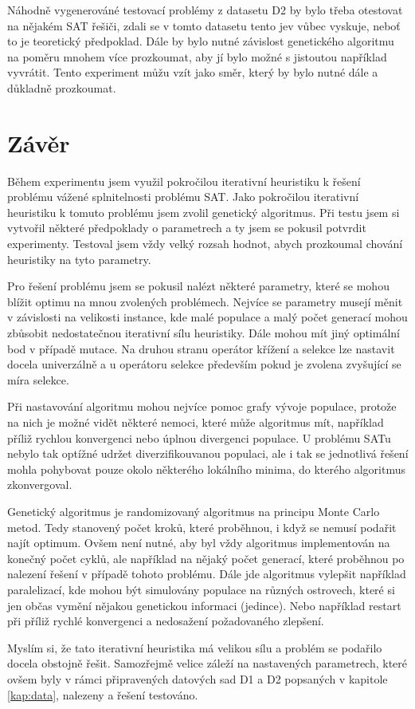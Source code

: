 \documentclass[11pt]{article}
\begin{document}
Náhodně vygenerováné testovací problémy z datasetu D2 by bylo třeba otestovat na nějakém SAT řešiči, zdali se v tomto datasetu tento jev vůbec vyskuje, neboť to je teoretický předpoklad. Dále by bylo nutné závislost genetického algoritmu na poměru mnohem více prozkoumat, aby jí bylo možné s jistoutou například vyvrátit. Tento experiment můžu vzít jako směr, který by bylo nutné dále a důkladně prozkoumat.

\section{Závěr}\label{kap:zaver}
Během experimentu jsem využil pokročilou iterativní heuristiku k řešení problému vážené splnitelnosti problému SAT. Jako pokročilou iterativní heuristiku k tomuto problému jsem zvolil genetický algoritmus. Při testu jsem si vytvořil některé předpoklady o parametrech a ty jsem se pokusil potvrdit experimenty. Testoval jsem vždy velký rozsah hodnot, abych prozkoumal chování heuristiky na tyto parametry. 

Pro řešení problému jsem se pokusil nalézt některé parametry, které se mohou blížit optimu na mnou zvolených problémech. Nejvíce se parametry musejí měnit v závislosti na velikosti instance, kde malé populace a malý počet generací mohou zbůsobit nedostatečnou iterativní sílu heuristiky. Dále mohou mít jiný optimální bod v případě mutace. Na druhou stranu operátor křížení a selekce lze nastavit docela univerzálně a u operátoru selekce především pokud je zvolena zvyšující se míra selekce. 

Při nastavování algoritmu mohou nejvíce pomoc grafy vývoje populace, protože na nich je možné vidět některé nemoci, které může algoritmus mít, například příliž rychlou konvergenci nebo úplnou divergenci populace. U problému SATu nebylo tak optížné udržet diverzifikouvanou populaci, ale i tak se jednotlivá řešení mohla pohybovat pouze okolo některého lokálního minima, do kterého algoritmus zkonvergoval. 

Genetický algoritmus je randomizovaný algoritmus na principu Monte Carlo metod. Tedy stanovený počet kroků, které proběhnou, i když se nemusí podařit najít optimum. Ovšem není nutné, aby byl vždy algoritmus implementován na konečný počet cyklů, ale například na nějaký počet generací, které proběhnou po nalezení řešení v případě tohoto problému. Dále jde algoritmus vylepšit například paralelizací, kde mohou být simulovány populace na různých ostrovech, které si jen občas vymění nějakou genetickou informaci (jedince). Nebo například restart při příliž rychlé konvergenci a nedosažení požadovaného zlepšení.

Myslím si, že tato iterativní heuristika má velikou sílu a problém se podařilo docela obstojně řešit. Samozřejmě velice záleží na nastavených parametrech, které ovšem byly v rámci připravených datových sad D1 a D2 popsaných v kapitole \ref{kap:data}, nalezeny a řešení testováno.
\end{document}
